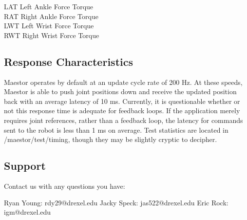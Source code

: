 \documentclass[12pt]{article}
\begin{document}
\noindent LAT		Left Ankle Force Torque\\
RAT		Right Ankle Force Torque\\
LWT		Left Wrist Force Torque\\
RWT		Right Wrist Force Torque\\

\subsection{Response Characteristics}

Maestor operates by default at an update cycle rate of 200 Hz. At these speeds, Maestor is able to push joint positions down and receive the updated position back with an average latency of 10 ms. Currently, it is questionable whether or not this response time is adequate for feedback loops. If the application merely requires joint references, rather than a feedback loop, the latency for commands sent to the  robot is less than 1 ms on average. Test statistics are located in /maestor/test/timing, though they may be slightly cryptic to decipher.

\subsection{Support}

Contact us with any questions you have:

Ryan Young: rdy29@drexel.edu
Jacky Speck: jas522@drexel.edu
Eric Rock: igm@drexel.edu
\end{document}
